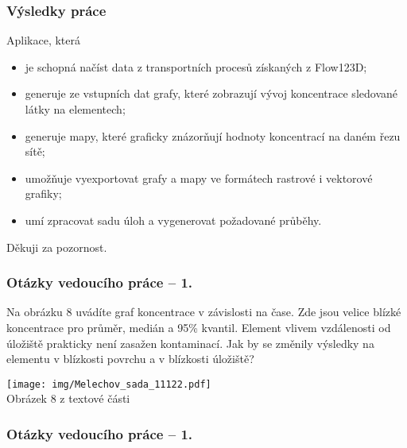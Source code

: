 \documentclass{beamer}
\begin{document}
\begin{frame}
	\frametitle{Výsledky práce}
	Aplikace, která
	\begin{itemize}
		\item je schopná načíst data z transportních procesů získaných z Flow123D;
		\item generuje ze vstupních dat grafy, které zobrazují vývoj koncentrace sledované látky na elementech;
		\item generuje mapy, které graficky znázorňují hodnoty koncentrací na daném řezu sítě;
		\item umožňuje vyexportovat grafy a mapy ve formátech rastrové i vektorové grafiky;
		\item umí zpracovat sadu úloh a vygenerovat požadované průběhy.
	\end{itemize}
\end{frame}

\begin{frame}{}{}
\begin{center}
\huge Děkuji za pozornost.
\end{center}
\end{frame}

\begin{frame}
	\frametitle{Otázky vedoucího práce -- 1.}
	\begin{block}{}
	{\footnotesize 	Na obrázku 8 uvádíte graf koncentrace v závislosti na čase. Zde jsou velice blízké koncentrace pro průměr, medián a 95\% kvantil. Element vlivem vzdálenosti od úložiště prakticky není zasažen kontaminací. Jak by se změnily výsledky na elementu v blízkosti povrchu a v blízkosti úložiště?}
	\end{block}
	\centering
		\texttt{[image: img/Melechov\_sada\_11122.pdf]}\\
		{\tiny Obrázek 8 z textové části}
	\vfill
\end{frame}

\begin{frame}
	\frametitle{Otázky vedoucího práce -- 1.}
	\hspace*{-10mm}
\end{frame}
\end{document}
